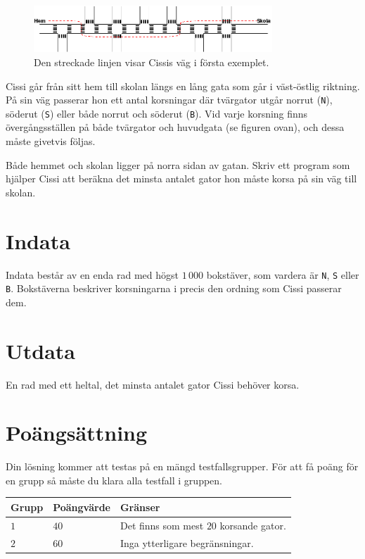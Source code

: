 
\begin{figure}[!h]
\begin{center}
\includegraphics[width=0.8\textwidth]{skolvag.png}
\end{center}
\caption{Den streckade linjen visar Cissis väg i första exemplet.}
\end{figure}

\noindent
Cissi går från sitt hem till skolan längs en lång gata som går i väst-östlig riktning.
På sin väg passerar hon ett antal korsningar där tvärgator utgår norrut (\texttt{N}), söderut (\texttt{S}) eller både norrut och söderut (\texttt{B}).
Vid varje korsning finns övergångsställen på både tvärgator och huvudgata (se figuren ovan), och dessa måste givetvis följas.

Både hemmet och skolan ligger på norra sidan av gatan.
Skriv ett program som hjälper Cissi att beräkna det minsta antalet gator hon måste korsa på sin väg till skolan. 

\section*{Indata}
Indata består av en enda rad med högst $1\,000$ bokstäver, som vardera är {\tt N}, {\tt S} eller {\tt B}.
Bokstäverna beskriver korsningarna i precis den ordning som Cissi passerar dem.

\section*{Utdata}
En rad med ett heltal, det minsta antalet gator Cissi behöver korsa.

\section*{Poängsättning}
Din lösning kommer att testas på en mängd testfallsgrupper.
För att få poäng för en grupp så måste du klara alla testfall i gruppen.

\noindent
\begin{tabular}{| l | l | p{12cm} |}
  \hline
  Grupp & Poängvärde & Gränser \\ \hline
  $1$    & $40$        & Det finns som mest $20$ korsande gator. \\ \hline 
  $2$    & $60$        & Inga ytterligare begränsningar. \\ \hline 
\end{tabular}
